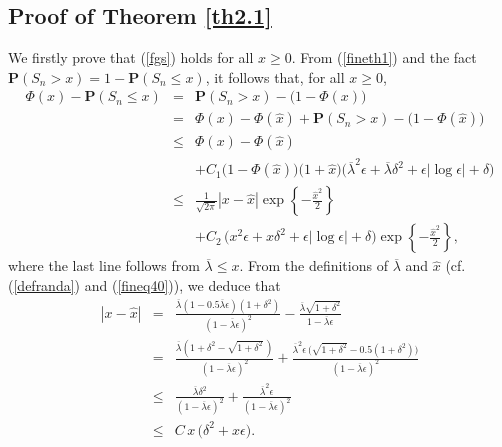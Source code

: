 \documentclass{gSTA2e}
\theoremstyle{plain}
\theoremstyle{definition}
\theoremstyle{remark}
\begin{document}
\subsection{Proof of Theorem  \ref{th2.1}}\label{sec3.2}
We firstly prove that (\ref{fgs}) holds for all $x\geq0$.
From (\ref{fineth1}) and the fact $\mathbf{P}(S_n>x)=1- \mathbf{P}(S_n \leq x)$, it follows that, for all $x\geq0$,
\begin{eqnarray}
 \Phi\left( x \right)-   \mathbf{P}(S_n \leq x )  &=&\mathbf{P}(S_n>x )- \Big( 1- \Phi\left( x \right) \Big)\nonumber\\
&=&\Phi(x)- \Phi\left( \widehat{x} \right) + \mathbf{P}(S_n>x )- \Big( 1- \Phi\left( \widehat{x} \right) \Big)  \nonumber\\
   &\leq& \Phi(x)- \Phi\left( \widehat{x} \right) \nonumber\\
    && + C_1\Big( 1- \Phi\left( \widehat{x} \right) \Big) \Big(1+ \widehat{x} \Big)  \Big(   \overline{\lambda}^2 \epsilon + \overline{\lambda} \delta^2  + \epsilon |\log \epsilon |  + \delta  \Big)   \nonumber\\
    &\leq& \frac{1}{\sqrt{2 \pi}} |x-\widehat{x}|\exp\left\{ -\frac{\widehat{x}^2 }{2} \right\} \label{fineq56}\\
    && + C_2 \,  \Big( x^2 \epsilon + x \delta^2  + \epsilon |\log \epsilon |  + \delta  \Big)\exp\left\{ -\frac{\widehat{x}^2 }{2} \right\}, \nonumber
\end{eqnarray}
where the last line follows from $\overline{\lambda} \leq   x$.
From the definitions of $\overline{\lambda}$  and $\widehat{x}$ (cf. (\ref{defranda}) and  (\ref{fineq40})), we deduce that
\begin{eqnarray}
   |x-\widehat{x}| &=& \frac{\overline{\lambda}(1-0.5\overline{\lambda}\epsilon)(1+\delta^2)}{ (1-\overline{\lambda}\epsilon)^2}- \frac{\overline{\lambda} \sqrt{ 1+\delta^2 }}{ 1-\overline{\lambda}\epsilon }  \nonumber\\
    &=& \frac{\overline{\lambda}( 1+ \delta^2 -   \sqrt{ 1+\delta^2 } \,) }{ (1-\overline{\lambda}\epsilon)^2} +\frac{\overline{\lambda}^2 \epsilon \,\big( \sqrt{ 1+\delta^2 } - 0.5(1+\delta^2) \big) }{ (1-\overline{\lambda}\epsilon)^2} \nonumber\\
     &\leq & \frac{\overline{\lambda}\delta^2  }{ (1-\overline{\lambda}\epsilon)^2} +\frac{\overline{\lambda}^2 \epsilon  }{ (1-\overline{\lambda}\epsilon)^2} \nonumber \\
    &\leq& C\, x\, \Big(\delta^2 +  x\epsilon \Big) .\label{fineq57}
\end{eqnarray}
\end{document}
